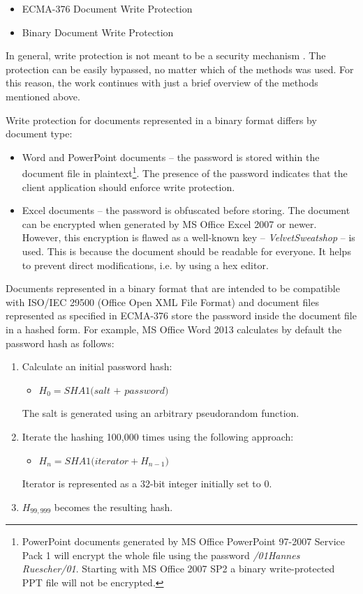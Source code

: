 \documentclass[11pt,oneside]{fithesis2}
\begin{document}
\begin{itemize}
\setlength\itemsep{0.1em}
	\item{ECMA-376 Document Write Protection}
	\item{Binary Document Write Protection}
\end{itemize}

In general, write protection is not meant to be a security mechanism \cite[p. 94]{msoffcrypto}. The protection can be easily bypassed, no matter which of the methods was used. For this reason, the work continues with just a brief overview of the methods mentioned above.

Write protection for documents represented in a binary format differs by document type:

\begin{itemize}
\setlength\itemsep{0.1em}
	\item{Word and PowerPoint documents -- the password is stored within the document file in plaintext\footnote{PowerPoint documents generated by MS Office PowerPoint 97-2007 Service Pack 1 will encrypt the whole file using the password \textit{/01Hannes Ruescher/01}. Starting with MS Office 2007 SP2 a binary write-protected PPT file will not be encrypted.}. The presence of the password indicates that the client application should enforce write protection.}
	\item{Excel documents -- the password is obfuscated before storing. The document can be encrypted when generated by MS Office Excel 2007 or newer. However, this encryption is flawed as a well-known key -- \textit{VelvetSweatshop} -- is used. This is because the document should be readable for everyone. It helps to prevent direct modifications, i.e. by using a hex editor.}
\end{itemize}

Documents represented in a binary format that are intended to be compatible with ISO/IEC 29500 (Office Open XML File Format) and document files represented as specified in ECMA-376 store the password inside the document file in a hashed form. For example, MS Office Word 2013 calculates by default the password hash as follows:

\begin{enumerate}
\item{Calculate an initial password hash:}
	\begin{itemize}
		\item{$H_0 =\textit{SHA1(salt + password)}$}
	\end{itemize}
	The salt is generated using an arbitrary pseudorandom function.
\item{Iterate the hashing 100,000 times using the following approach:}
	\begin{itemize}
		\item{$H_n = \textit{SHA1(iterator}+ H_{n-1})$}
	\end{itemize}
	Iterator is represented as a 32-bit integer initially set to 0.
\item{$H_{99,999}$ becomes the resulting hash.}
\end{enumerate}
\end{document}

